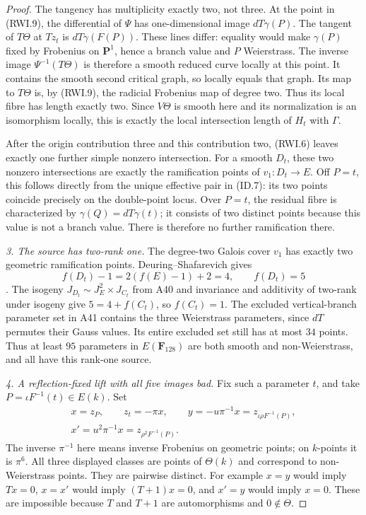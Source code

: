 \begin{proof}
The tangency has multiplicity exactly two, not three.
At the point in (RWI.9), the differential of $\Psi$ has
one-dimensional image $dT\gamma(P)$. The tangent of
$T\Theta$ at $Tz_t$ is $dT\gamma(F(P))$.
These lines differ: equality would make $\gamma(P)$
fixed by Frobenius on $\mathbf P^1$, hence a branch
value and $P$ Weierstrass. The inverse image
$\Psi^{-1}(T\Theta)$ is therefore a smooth reduced
curve locally at this point. It contains the smooth
second critical graph, so locally equals that graph.
Its map to $T\Theta$ is, by (RWI.9), the radicial
Frobenius map of degree two. Thus its local fibre has
length exactly two. Since $V\Theta$ is smooth here
and its normalization is an isomorphism locally, this
is exactly the local intersection length of $H_t$
with $\Gamma$.

After the origin contribution three and this contribution
two, (RWI.6) leaves exactly one further simple nonzero
intersection. For a smooth $D_t$, these two nonzero
intersections are exactly the ramification points of
$v_1:D_t\to E$. Off $P=t$, this follows directly from
the unique effective pair in (ID.7): its two points
coincide precisely on the double-point locus. Over
$P=t$, the residual fibre is characterized by
$\gamma(Q)=dT\gamma(t)$; it consists of two distinct
points because this value is not a branch value.
There is therefore no further ramification there.

\emph{3. The source has two-rank one.}
The degree-two Galois cover $v_1$ has exactly two
geometric ramification points. Deuring--Shafarevich gives
\[
                 f(D_t)-1=2(f(E)-1)+2=4,
                      \qquad f(D_t)=5
 \tag{RWI.10}
\]
\cite[Corollary~1.8, pp.~35--36]{Crew1984}.
The isogeny $J_{D_t}\sim J_E^2\times J_{C_t}$ from
A40 and invariance and additivity of two-rank under
isogeny give $5=4+f(C_t)$, so $f(C_t)=1$.
The excluded vertical-branch parameter set in A41
contains the three Weierstrass parameters, since
$dT$ permutes their Gauss values. Its entire excluded
set still has at most $34$ points. Thus at least $95$
parameters in $E(\mathbf F_{128})$ are both smooth and
non-Weierstrass, and all have this rank-one source.

\emph{4. A reflection-fixed lift with all five images bad.}
Fix such a parameter $t$, and take
$P=\iota F^{-1}(t)\in E(k)$. Set
\[
 \begin{gathered}
 x=z_P,\qquad z_t=-\pi x,\qquad
 y=-u\pi^{-1}x=z_{\iota\rho F^{-1}(P)},\\
 x'=u^2\pi^{-1}x=z_{\rho^2F^{-1}(P)}.
 \end{gathered}
 \tag{RWI.11}
\]
The inverse $\pi^{-1}$ here means inverse Frobenius
on geometric points; on $k$-points it is $\pi^6$.
All three displayed classes are points of $\Theta(k)$
and correspond to non-Weierstrass points. They are
pairwise distinct. For example $x=y$ would imply
$Tx=0$, $x=x'$ would imply $(T+1)x=0$, and $x'=y$
would imply $x=0$. These are impossible because $T$
and $T+1$ are automorphisms and $0\notin\Theta$.


\end{proof}
